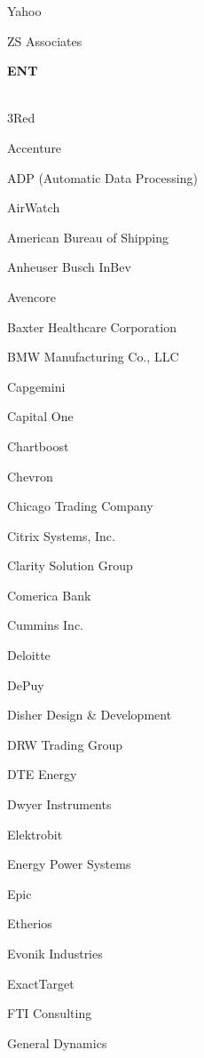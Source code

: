 \documentclass[twoside]{article}
\begin{document}
\begin{center}
\begin{multicols}{5}
\begin{FlushLeft}
\begin{compactitem}
\item Yahoo
\item ZS Associates
\end{compactitem}
        \end{FlushLeft}
        \vspace{1em}
        {\fontsize{14}{16}\selectfont \bf ENT}\\
        \vspace{-1em}
        ~\hrulefill~
        \vspace{-.9em}
        \begin{FlushLeft}
        \begin{compactitem}
        \item 3Red
\item Accenture
\item ADP (Automatic Data Processing)
\item AirWatch
\item American Bureau of Shipping
\item Anheuser Busch InBev
\item Avencore
\item Baxter Healthcare Corporation
\item BMW Manufacturing Co., LLC
\item Capgemini
\item Capital One
\item Chartboost
\item Chevron
\item Chicago Trading Company
\item Citrix Systems, Inc.
\item Clarity Solution Group
\item Comerica Bank
\item Cummins Inc.
\item Deloitte
\item DePuy
\item Disher Design \& Development
\item DRW Trading Group
\item DTE Energy
\item Dwyer Instruments
\item Elektrobit
\item Energy Power Systems
\item Epic
\item Etherios
\item Evonik Industries
\item ExactTarget
\item FTI Consulting
\item General Dynamics

\end{compactitem}
\end{FlushLeft}
\end{multicols}
\end{center}
\end{document}
